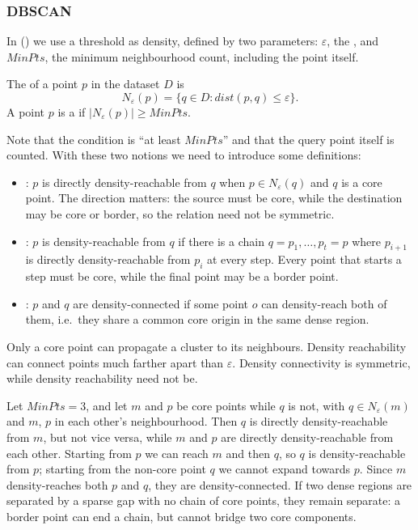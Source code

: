 \subsubsection{DBSCAN}

In  () we use a threshold as density, defined by two parameters: $\varepsilon$, the , and $MinPts$, the minimum neighbourhood count, including the point itself.

\begin{definition}
The  of a point $p$ in the dataset $D$ is
\[
N_\varepsilon(p) = \{q \in D : dist(p, q) \le \varepsilon\}.
\]
A point $p$ is a  if $|N_\varepsilon(p)| \ge MinPts$.
\end{definition}

Note that the condition is ``at least $MinPts$'' and that the query point itself is counted. With these two notions we need to introduce some definitions:
\begin{itemize}
  \item {}: $p$ is directly density-reachable from $q$ when $p \in N_\varepsilon(q)$ and $q$ is a core point. The direction matters: the source must be core, while the destination may be core or border, so the relation need not be symmetric.
  \item {}: $p$ is density-reachable from $q$ if there is a chain $q = p_1, \dots, p_t = p$ where $p_{i+1}$ is directly density-reachable from $p_i$ at every step. Every point that starts a step must be core, while the final point may be a border point.
  \item {}: $p$ and $q$ are density-connected if some point $o$ can density-reach both of them, i.e.\ they share a common core origin in the same dense region.
\end{itemize}

\begin{remark}
Only a core point can propagate a cluster to its neighbours. Density reachability can connect points much farther apart than $\varepsilon$. Density connectivity is symmetric, while density reachability need not be.
\end{remark}

\begin{example}
Let $MinPts = 3$, and let $m$ and $p$ be core points while $q$ is not, with $q \in N_\varepsilon(m)$ and $m$, $p$ in each other's neighbourhood. Then $q$ is directly density-reachable from $m$, but not vice versa, while $m$ and $p$ are directly density-reachable from each other. Starting from $p$ we can reach $m$ and then $q$, so $q$ is density-reachable from $p$; starting from the non-core point $q$ we cannot expand towards $p$. Since $m$ density-reaches both $p$ and $q$, they are density-connected. If two dense regions are separated by a sparse gap with no chain of core points, they remain separate: a border point can end a chain, but cannot bridge two core components.
\end{example}

